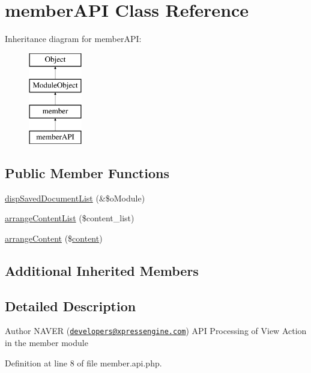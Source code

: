 \hypertarget{classmemberAPI}{}\section{member\+A\+PI Class Reference}
\label{classmemberAPI}
Inheritance diagram for member\+A\+PI\+:\begin{figure}[H]
\begin{center}
\leavevmode
\includegraphics[height=4.000000cm]{classmemberAPI}
\end{center}
\end{figure}
\subsection*{Public Member Functions}
\begin{DoxyCompactItemize}
\item 
\hyperlink{classmemberAPI_ab5fd91bb448c7ba48304a12965b81a54}{disp\+Saved\+Document\+List} (\&\$o\+Module)
\item 
\hyperlink{classmemberAPI_accb093980616ddbea40361249379a01b}{arrange\+Content\+List} (\$content\+\_\+list)
\item 
\hyperlink{classmemberAPI_a2f05be1a71de779b38ea5c0e113969ea}{arrange\+Content} (\$\hyperlink{classcontent}{content})
\end{DoxyCompactItemize}
\subsection*{Additional Inherited Members}


\subsection{Detailed Description}
\begin{DoxyAuthor}{Author}
N\+A\+V\+ER (\href{mailto:developers@xpressengine.com}{\tt developers@xpressengine.\+com}) A\+PI Processing of View Action in the member module 
\end{DoxyAuthor}


Definition at line 8 of file member.\+api.\+php.




